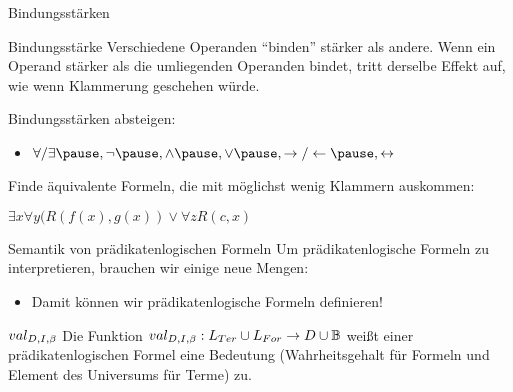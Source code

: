 \begin{frame}{Bindungsstärken}
	\begin{block}{Bindungsstärke}
		Verschiedene Operanden ``binden'' stärker als andere. \ip Wenn ein Operand stärker als die umliegenden Operanden bindet, tritt derselbe Effekt auf, wie wenn Klammerung geschehen würde.
	\end{block}

	\bp
	
	Bindungsstärken absteigen:
	\begin{itemize}
		\ip \item $\forall / \exists\ip,\lnot\ip,\land\ip,\lor\ip,\rightarrow/\leftarrow\ip,\leftrightarrow$
	\end{itemize}

	\bp
	
	Finde äquivalente Formeln, die mit möglichst wenig Klammern auskommen:
	\begin{itemize}
		\pitem $\exists x \forall y (R(f(x), g(x)) \lor \forall z R(c, x)$ %
	\end{itemize}

\end{frame}

\begin{frame}{Semantik von prädikatenlogischen Formeln}
	Um prädikatenlogische Formeln zu interpretieren, brauchen wir einige neue Mengen:
	
	\begin{itemize}
		\pitem Interpretation $(D, I)$\ip, bestehend aus...
		\begin{itemize}
			\pitem Universum $D \neq \emptyset$ mit...
			\begin{itemize}
				\pitem $I(c_i) \in D$ für $c_i \in Const_{PL}$
				\pitem $I(f_i) : D^{ar(f_i)} \rightarrow D$ für $f_i \in Fun_{PL}$
				\pitem $I(R_i) \subseteq D^{ar(R_i)}$ für $R_i \in Rel_{PL}$
				\pitem $I$ bildet weißt also den Komponenten Bedeutungen zu, ``definiert diese''
			\end{itemize}
		
			\pitem Variablenbelegung $\beta : Var_{PL} \rightarrow D$, z.B. $\beta(x) := 3, \beta(y) := 11$
			\begin{itemize}
				\pitem $\beta$ definiert also Variablenwerte
			\end{itemize}
		\end{itemize}
	
		\bp
	
		\item Damit können wir prädikatenlogische Formeln definieren!
	\end{itemize}

	\p
	
	\begin{block}{$val_{D,I,\beta}$}
		Die Funktion $val_{D,I,\beta} : L_{Ter} \cup L_{For} \rightarrow D \cup \mathbb{B}$ \ip weißt einer prädikatenlogischen Formel eine Bedeutung \ip (Wahrheitsgehalt für Formeln und Element des Universums für Terme) zu.
	\end{block}
\end{frame}

